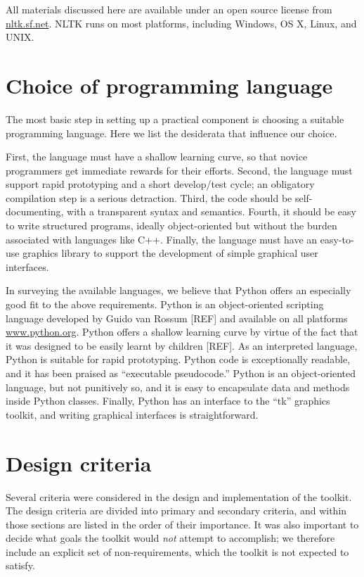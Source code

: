 \documentclass[11pt]{article}
\begin{document}
All materials discussed here are available under an open
source license from \url{nltk.sf.net}.
NLTK runs on most platforms, including Windows, OS X, Linux, and
UNIX.

\section{Choice of programming language}

The most basic step in setting up a practical component is choosing a
suitable programming language.  Here we list the desiderata that influence
our choice.

First, the language must have a shallow learning curve, so that novice
programmers get immediate rewards for their efforts.
Second, the language must support rapid prototyping and a short develop/test cycle;
an obligatory compilation step is a serious detraction.
Third, the code should be self-documenting,
with a transparent syntax and semantics.
Fourth, it should be easy to write structured programs, ideally object-oriented
but without the burden associated with languages like C++.
Finally, the language must have an easy-to-use graphics library to support
the development of simple graphical user interfaces.

In surveying the available languages, we believe that Python offers an especially good
fit to the above requirements.  Python is an object-oriented scripting language
developed by Guido van Rossum [REF] and available on all platforms
\url{www.python.org}.
Python offers a shallow learning curve by virtue of the
fact that it was designed to be easily learnt by children [REF].
As an interpreted language, Python is suitable for rapid prototyping.
Python code is exceptionally readable, and it has been praised as
``executable pseudocode.''
Python is an object-oriented language, but not punitively so, and it
is easy to encapsulate data and methods inside Python classes.
Finally, Python has an interface to the ``tk'' graphics toolkit, and
writing graphical interfaces is straightforward.

\section{Design criteria}

Several criteria were considered in the design and implementation of
the toolkit.  The design criteria are divided into primary and
secondary criteria, and within those sections are listed in the order
of their importance.  It was also important to decide what goals the
toolkit would \emph{not} attempt to accomplish; we therefore include
an explicit set of non-requirements, which the toolkit is not expected
to satisfy.
\end{document}
